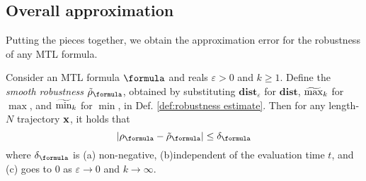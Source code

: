 \subsection{Overall approximation}
\label{sec:overall apx}
Putting the pieces together, we obtain the approximation error for the robustness of any MTL formula.
\begin{theorem}
	\label{thm:total apx error}
	Consider an MTL formula $\formula$ and reals $\varepsilon > 0$ and $k \geq 1$. 
	Define the \textit{smooth robustness} $\srobf$, obtained by substituting $\mathbf{dist}_\varepsilon$ for $\mathbf{dist}$, $\widetilde{\max}_k$ for $\max$, and $\widetilde{\min}_k$ for $\min$, in Def. \ref{def:robustness estimate}.
	Then for any length-$N$ trajectory $\mathbf{x}$, it holds that
	\[|\robf-\srobf| \leq \delta_\formula\]
	where $\delta_\formula$ is (a) non-negative, 
	(b)independent of the evaluation time $t$, and 
	(c) goes to 0 as $\varepsilon \rightarrow 0$ and $k \rightarrow \infty$.
\end{theorem}
